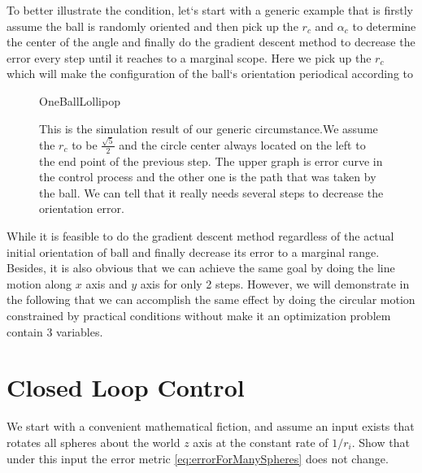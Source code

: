 \documentclass[letter paper, 10pt, conference]{ieeeconf}
\newcommand{\todo}[1]{\vspace{5 mm}\par \noindent \framebox{\begin{minipage}[c]{0.98 \columnwidth} \ttfamily\flushleft \textcolor{red}{#1}\end{minipage}}\vspace{5 mm}\par}
\begin{document}
To better illustrate the condition, let`s start with a generic example that is firstly assume the ball is randomly oriented and then pick up the $r_c$ and $\alpha_c$ to determine the center of the angle and finally do the gradient descent method to decrease the error every step until it reaches to a marginal scope. Here we pick up the $r_c$ which will make the configuration of the ball`s orientation periodical according to \todo{ [[insert references:Ball Rolling and Cone]] }
    \begin{figure}%
	\begin{center}
	\begin{overpic}[width=.9\columnwidth]{OneBallLollipop}
	\end{overpic}
	\end{center}
	\vspace{-1em}
	\caption{ \label{fig:OneBallLollipop} This is the simulation result of our generic circumstance.We assume the $r_c$ to be $\frac{\sqrt{5}}{2}$ and the circle center always located on the left to the end point of the previous step. The upper graph is error curve in the control process and the other one is the path that was taken by the ball. We can tell that it really needs several steps to decrease the orientation error.
}\vspace{-1em}
\end{figure}

While it is feasible to do the gradient descent method regardless of the actual initial orientation of ball and finally decrease its error to a marginal range. Besides, it is also obvious that we can achieve the same goal by doing the line motion along $x$ axis and $y$ axis for only 2 steps. However, we will demonstrate in the following that we can accomplish the same effect by doing the circular motion constrained by practical conditions without make it an optimization problem contain 3 variables.



\section{Closed Loop Control}\label{sec:ClosedLoopControl}%

We start with a convenient mathematical fiction, and assume an input exists that rotates all spheres about the world $z$ axis at the constant rate of $1/r_i$.  
Show that under this input the error metric \eqref{eq:errorForManySpheres} does not change.
\end{document}

